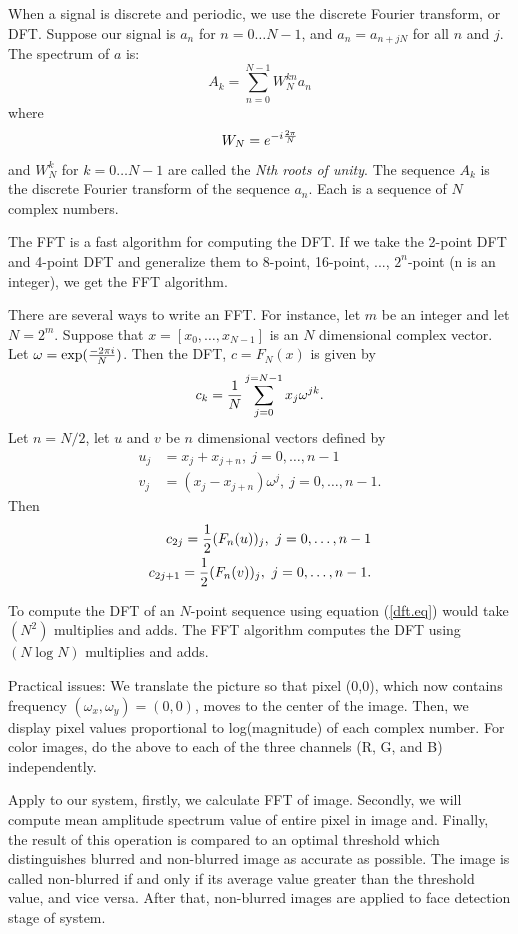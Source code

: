 \documentclass[journal, twocolumn]{IEEEtran}
\begin{document}
When a signal is discrete and periodic, we use the discrete Fourier transform, or DFT.
Suppose our signal is $a_n$ for $n=0 \ldots N-1$,
and $a_n=a_{n+jN}$ for all $n$ and $j$.
The spectrum of $a$ is:
\begin{equation}
A_k = \sum_{n=0}^{N-1} W_N^{kn} a_n
\label{dft.eq}
\end{equation}
where
$$
W_N = e^{-i {2 \pi \over N}}
$$
and $W_N^k$ for $k=0 \ldots N-1$ are called the {\it Nth roots of unity}.
The sequence $A_k$ is the discrete Fourier transform of the sequence $a_n$.
Each is a sequence of $N$ complex numbers.

The FFT is a fast algorithm for computing the DFT.
If we take the 2-point DFT and 4-point DFT and generalize them
to 8-point, 16-point, ..., $2^n$-point (n is an integer), we get the FFT algorithm.

There are several ways to write an FFT. For instance, let $m$ be an integer and let $N=2^m$.
Suppose that $x=[x_0,\ldots,x_{N-1}]$ is an $N$ dimensional complex vector.
Let $\omega=\exp({-2\pi i\over N})$.  Then the DFT, $c= F_N(x)$ is given by
\begin{equation}
c_k={1\over N}\sum_{j=0}^{j=N-1}x_j\omega^{jk}.
\end{equation}
Let $n=N/2$, let $u$ and $v$ be $n$ dimensional vectors defined by 
\begin{align}
u_j&=x_j+x_{j+n},\ j=0,\ldots,n-1\\
v_j&=(x_j-x_{j+n})\omega ^j,\ j=0,\ldots,n-1.
\end{align}
Then 
\begin{align}
c_{2j}={1\over 2}(F_n(u))_j,\ j=0,\ldots,n-1\\
c_{2j+1}={1\over 2}(F_n(v))_j,\ j=0,\ldots,n-1.
\end{align}

To compute the DFT of an $N$-point sequence using equation (\ref{dft.eq})
would take $(N^2)$ multiplies and adds.
The FFT algorithm computes the DFT using $(N \log N)$ multiplies and adds.

Practical issues:
We translate the picture so that pixel (0,0), which now contains frequency $(\omega_x,\omega_y)=(0,0)$, moves to the center of the image. Then, we display pixel values proportional to
log(magnitude) of each complex number. For color images, do the above to each of the three channels
(R, G, and B) independently.

Apply to our system, firstly, we calculate FFT of image. Secondly, we will compute mean amplitude spectrum value of entire pixel in image and. Finally, the result of this operation is compared to an optimal threshold which distinguishes blurred and non-blurred image as accurate as possible. The image is called non-blurred if and only if its average value greater than the threshold value, and vice versa. After that, non-blurred images are applied to face detection stage of system.
\end{document}
